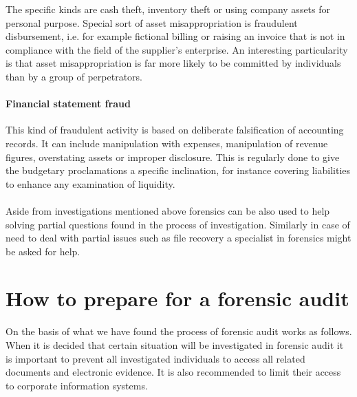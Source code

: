 The specific kinds are cash theft, inventory theft or using company assets for personal purpose. Special sort of asset misappropriation is fraudulent disbursement, i.e. for example fictional billing or raising an invoice that is not in compliance with the field of the supplier's enterprise. An interesting particularity is that asset misappropriation is far more likely to be committed by individuals than by a group of perpetrators\cite{whitepaper}.


\paragraph {Financial statement fraud}
This kind of fraudulent activity is based on deliberate falsification of accounting records. It can include manipulation with expenses, manipulation of revenue figures, overstating assets or improper disclosure. This is regularly done to give the budgetary proclamations a specific inclination, for instance covering liabilities to enhance any examination of liquidity.


\paragraph{} Aside from investigations mentioned above forensics can be also used to help solving partial questions found in the process of investigation. Similarly in case of need to deal with partial issues such as file recovery a specialist in forensics might be asked for help.




\section{How to prepare for a forensic audit}

On the basis of what we have found the process of forensic audit works as follows. When it is decided that certain situation will be investigated in forensic audit it is important to prevent all investigated individuals to access all related documents and electronic evidence. It is also recommended to limit their access to corporate information systems. 

